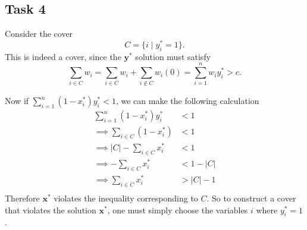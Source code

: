 \documentclass{article}
\begin{document}
\noindent

\subsection*{Task 4}%

Consider the cover 
\[
C = \{ i \;|\; y_i^* = 1\}.
\]
This is indeed a cover, since the $\mathbf{y}^*$ solution must satisfy
\[
\sum_{i \in C}^{} w_i = \sum_{i \in C}^{} w_i + \sum_{i \notin C}^{} w_i(0) =  \sum_{i=1}^{n} w_i y_i^* > c.
\]

Now if $\sum_{i=1}^{n}(1 - x_i^*)y_{i}^* < 1$, we can make the following calculation
\begin{align*}
   \sum_{i=1}^{n} (1 - x_i^*)y_i^* &< 1 \\ 
\implies   \sum_{i \in C} (1 - x_i^*) &< 1 \\ 
 \implies |C| -\sum_{i \in C} x_i^* &< 1 \\ 
\implies  -\sum_{i \in C} x_i^* &< 1 - |C|\\ 
\implies  \sum_{i \in C} x_i^* &> |C| - 1\\ 
\end{align*}
Therefore $\mathbf{x}^*$ violates the inequality corresponding to $C$.
So to construct a cover that violates the solution $\mathbf{x}^*$, one must simply choose the variables $i$ where $y^*_i = 1$.



%
\end{document}
